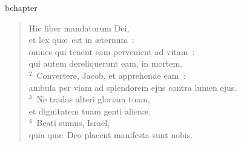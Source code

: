 bchapter\begin{verse}\vspace{-19pt}Hic liber mandatorum Dei,\\ et lex qu\ae\ est in \ae ternum~:\\ omnes qui tenent eam pervenient ad vitam~:\\ qui autem dereliquerunt eam, in mortem.\\
${}^{2}$~Convertere, Jacob, et apprehende eam~:\\ ambula per viam ad splendorem ejus contra lumen ejus.\\
${}^{3}$~Ne tradas alteri gloriam tuam,\\ et dignitatem tuam genti alien\ae .\\
${}^{4}$~Beati sumus, Isra\"el,\\ quia qu\ae\ Deo placent manifesta sunt nobis.\end{verse}


